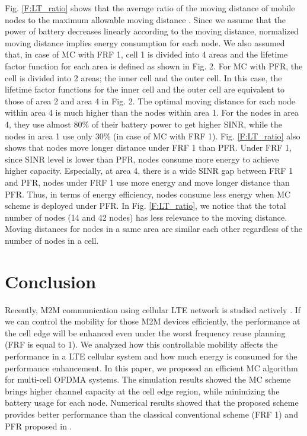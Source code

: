 \documentclass[conference]{IEEEtran}
\begin{document}
Fig. \ref{F:LT_ratio} shows that the average ratio of the moving distance of mobile nodes to the maximum allowable moving distance . Since we assume that the power of battery decreases linearly according to the moving distance, normalized moving distance implies energy consumption for each node. We also assumed that, in case of MC with FRF 1, cell 1 is divided into 4 areas and the lifetime factor function for each area is defined as shown in Fig. 2. For MC with PFR, the cell is divided into 2 areas; the inner cell and the outer cell. In this case, the lifetime factor functions for the inner cell and the outer cell are equivalent to those of area 2 and area 4 in Fig. 2. The optimal moving distance for each node within area 4 is much higher than the nodes within area 1. For the nodes in area 4, they use almost 80\% of their battery power to get higher SINR, while the nodes in area 1 use only 30\% (in case of MC with FRF 1). Fig. \ref{F:LT_ratio} also shows that nodes move longer distance under FRF 1 than PFR. Under FRF 1, since SINR level is lower than PFR, nodes consume more energy to achieve higher capacity. Especially, at area 4, there is a wide SINR gap between FRF 1 and PFR, nodes under FRF 1 use more energy and move longer distance than PFR. Thus, in terms of energy efficiency, nodes consume less energy when MC scheme is deployed under PFR. In Fig. \ref{F:LT_ratio}, we notice that the total number of nodes (14 and 42 nodes) has less relevance to the moving distance. Moving distances for nodes in a same area are similar each other regardless of the number of nodes in a cell.



\section{Conclusion}

Recently, M2M communication using cellular LTE network is studied actively \cite{3GPP_b}. If we can control the mobility for those M2M devices efficiently, the performance at the cell edge will be enhanced even under the worst frequency reuse planning (FRF is equal to 1). We analyzed how this controllable mobility affects the performance in a LTE cellular system and how much energy is consumed for the performance enhancement. In this paper, we proposed an efficient MC algorithm for multi-cell OFDMA systems. The simulation results showed the MC scheme brings higher channel capacity at the cell edge region, while minimizing the battery usage for each node. Numerical results showed that the proposed scheme provides better performance than the classical conventional scheme (FRF 1) and PFR proposed in \cite{Najjar}.
\end{document}
